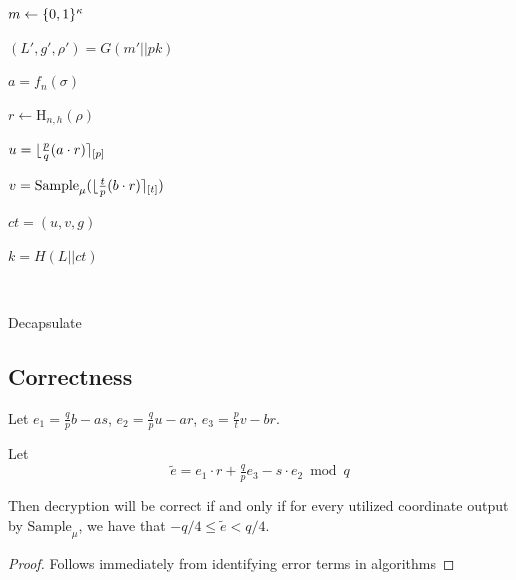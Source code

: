 \begin{algorithm}

    $m \gets \{0,1\}^{\kappa}$\

    $(L',g',\rho')=G(m'||pk)$\

    $a=f_{n}(\sigma)$\
    
    $r \gets \text{H}_{n,h}(\rho)$\

    $u=\lfloor\tfrac{p}{q}(a\cdot r)\rceil_{[p]}$\

    $v=\text{Sample}_{\mu}(\lfloor\tfrac{t}{p} (b \cdot r)\rceil_{[t]})$\

    $ct=(u,v,g)$\

    $k=H(L||ct)$\

    \

    \caption{Decapsulate}
\end{algorithm}


\subsection{Correctness}
\label{sec:correctness}

\begin{lemma}
\label{lem:correctness}
Let $e_1 = \tfrac{q}{p}b-as$, $e_2=\tfrac{q}{p}u-ar$,
$e_3=\tfrac{p}{t}v-br$. 

Let
\begin{equation*}
\label{eq:erroroverall}
\tilde{e}=e_1\cdot r+\tfrac{q}{p}e_3-s\cdot e_2 \bmod{q}
\end{equation*}

Then decryption will be correct if and only if for every utilized
coordinate output by $\text{Sample}_{\mu}$, we have that $-q/4 \leq
\tilde{e} < q/4$. 
\end{lemma}

\begin{proof}
Follows immediately from identifying error terms in algorithms
\end{proof}

